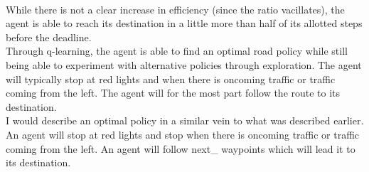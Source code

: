 \documentclass[11pt]{article}
\begin{document}
\\  

While there is not a clear increase in efficiency (since the ratio vacillates), the agent is able to reach its destination in a little more than half of its allotted steps before the deadline.\\

Through q-learning, the agent is able to find an optimal road policy while still being able to experiment with alternative policies through exploration. The agent will typically stop at red lights and when there is oncoming traffic or traffic coming from the left. The agent will for the most part follow the route to its destination.\\

I would describe an optimal policy in a similar vein to what was described earlier. An agent will stop at red lights and stop when there is oncoming traffic or traffic coming from the left. An agent will follow next\_ waypoints which will lead it to its destination.\\
\end{document}
